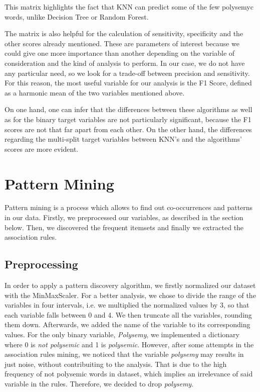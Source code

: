 \documentclass[a4paper,11pt,dvipsnames]{article}
\begin{document}
This matrix highlights the fact that KNN can predict some of the few polysemyc words, unlike Decision Tree or Random Forest.  

The matrix is also helpful for the calculation of sensitivity, specificity and the other scores already mentioned. These are parameters of interest because we could give one more importance than another depending on the variable of consideration and the kind of analysis to perform. In our case, we do not have any particular need, so we look for a trade-off between precision and sensitivity. For this reason, the most useful variable for our analysis is the F1 Score, defined as a harmonic mean of the two variables mentioned above.

On one hand, one can infer that the differences between these algorithms as well as for the binary target variables are not particularly significant, because the F1 scores are not that far apart from each other. On the other hand, the differences regarding the multi-split target variables between KNN's and the algorithms' scores are more evident. 

\section{Pattern Mining}
Pattern mining is a process which allows to find out co-occurrences and patterns in our data. Firstly, we preprocessed our variables, as described in the section below. Then, we discovered the frequent itemsets and finally we extracted the association rules. 

\subsection{Preprocessing}
In order to apply a pattern discovery algorithm, we firstly normalized our dataset with the MinMaxScaler. For a better analysis, we chose to divide the range of the variables in four intervals, i.e. we  multiplied the normalized values by 3, so that each variable falls between 0 and 4. We then truncate all the variables, rounding them down. Afterwards, we added the name of the variable to its corresponding values. For the only binary variable, \textit{Polysemy}, we implemented a dictionary where 0 is \textit{not polysemic} and 1 is \textit{polysemic}. However, after some attempts in the association rules mining, we noticed that the variable \textit{polysemy} may results in just noise, without contribuiting to the analysis. That is due to the high frequency of not polysemic words in dataset, which implies an irrelevance of said variable in the rules.
Therefore, we decided to drop \textit{polysemy}.
\end{document}
